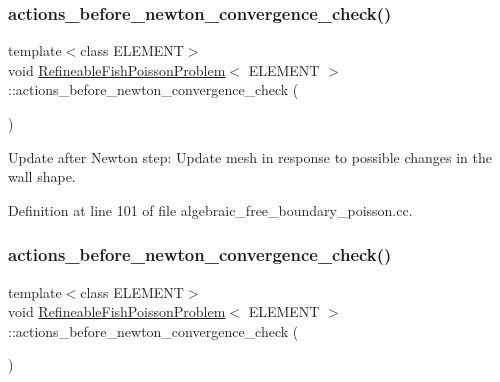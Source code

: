 \subsubsection{\texorpdfstring{actions\+\_\+before\+\_\+newton\+\_\+convergence\+\_\+check()}{actions\_before\_newton\_convergence\_check()}\hspace{0.1cm}{\footnotesize\ttfamily [1/2]}}
{\footnotesize\ttfamily template$<$class E\+L\+E\+M\+E\+NT$>$ \\
void \hyperlink{classRefineableFishPoissonProblem}{Refineable\+Fish\+Poisson\+Problem}$<$ E\+L\+E\+M\+E\+NT $>$\+::actions\+\_\+before\+\_\+newton\+\_\+convergence\+\_\+check (\begin{DoxyParamCaption}{ }\end{DoxyParamCaption})\hspace{0.3cm}{\ttfamily [inline]}}



Update after Newton step\+: Update mesh in response to possible changes in the wall shape. 



Definition at line 101 of file algebraic\+\_\+free\+\_\+boundary\+\_\+poisson.\+cc.

\mbox{\label{classRefineableFishPoissonProblem_a8d8fb7ef1c571c57c02073edab4a7759}} 
\subsubsection{\texorpdfstring{actions\+\_\+before\+\_\+newton\+\_\+convergence\+\_\+check()}{actions\_before\_newton\_convergence\_check()}\hspace{0.1cm}{\footnotesize\ttfamily [2/2]}}
{\footnotesize\ttfamily template$<$class E\+L\+E\+M\+E\+NT$>$ \\
void \hyperlink{classRefineableFishPoissonProblem}{Refineable\+Fish\+Poisson\+Problem}$<$ E\+L\+E\+M\+E\+NT $>$\+::actions\+\_\+before\+\_\+newton\+\_\+convergence\+\_\+check (\begin{DoxyParamCaption}{ }\end{DoxyParamCaption})\hspace{0.3cm}{\ttfamily [inline]}}



